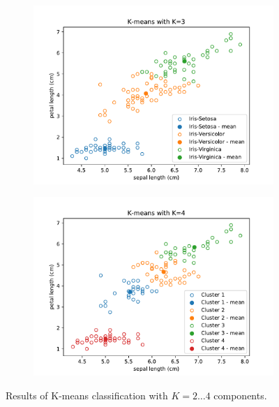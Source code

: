\documentclass{article}
\begin{document}
\begin{figure}[!ht]
{	\begin{subfigure}{0.6\textwidth}
	\includegraphics[width=\textwidth]{./Figures/2_2_Kmeans_scatter_K3}
	\end{subfigure}
	\begin{subfigure}{0.6\textwidth}
	\includegraphics[width=\textwidth]{./Figures/2_2_Kmeans_scatter_K4}
	\end{subfigure}
	}	
	\caption{Results of K-means classification with $K=2\dots4$ components.}
	\label{2_2_Kmeans_scatter}
\end{figure}
\end{document}
